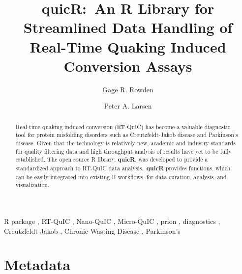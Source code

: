 \documentclass[preprint,12pt,a4paper]{elsarticle}
\begin{document}
\renewcommand{\labelenumii}{\arabic{enumi}.\arabic{enumii}}

\begin{frontmatter}

\title{\textbf{quicR}:\ An R Library for Streamlined Data Handling of Real-Time Quaking Induced Conversion Assays}
\author[label1,label2,label3]{Gage R. Rowden}
\author[label1,label2,label3]{Peter A. Larsen}
\address[label1]{Department of Veterinary and Biomedical Sciences, University of Minnesota, USA.}
\address[label2]{Minnesota Center for Prion Research and Outreach, University of Minnesota, USA.}
\address[label3]{Priogen Corp., USA.}

\begin{abstract}
Real-time quaking induced conversion (RT-QuIC) has become a valuable diagnostic tool for protein misfolding disorders such as Creutzfeldt-Jakob disease and Parkinson's disease. Given that the technology is relatively new, academic and industry standards for quality filtering data and high throughput analysis of results have yet to be fully established. The open source R library, \textbf{quicR}, was developed to provide a standardized approach to RT-QuIC data analysis.\ \textbf{quicR} provides functions, which can be easily integrated into existing R workflows, for data curation, analysis, and visualization.
\end{abstract}

\begin{keyword}
R package \sep{} RT-QuIC \sep{} Nano-QuIC \sep{} Micro-QuIC \sep{} prion \sep{} diagnostics \sep{} Creutzfeldt-Jakob \sep{} Chronic Wasting Disease \sep{} Parkinson's
\end{keyword}

\end{frontmatter}


\section*{Metadata}
\end{document}
